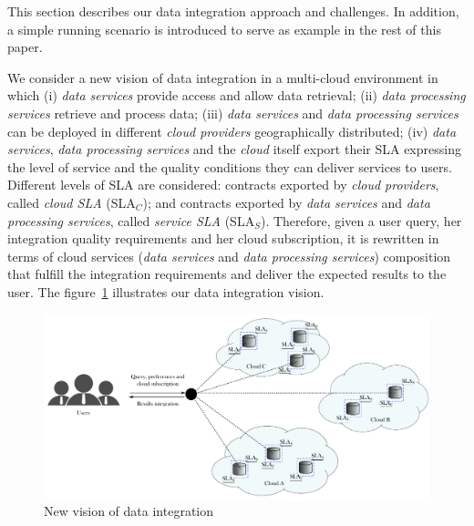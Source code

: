 This section describes our data integration approach and challenges. In addition, a simple running scenario is introduced to serve as example in the rest of this paper.

We consider a new vision of data integration in a multi-cloud environment in which 
(i) \textit{data services} provide access and allow data retrieval;  
(ii) \textit{data processing services} retrieve and process data; 
(iii) \textit{data services} and \textit{data processing services} can be deployed in different \textit{cloud providers} geographically distributed; 
(iv) \textit{data services}, \textit{data processing services} and the \textit{cloud} itself export their SLA expressing the level of service and the quality conditions they can deliver services to users. Different levels of SLA are considered: contracts exported by \textit{cloud providers}, called \textit{cloud SLA} (SLA$_{C}$); and contracts exported by \textit{data services} and \textit{data processing services}, called \textit{service SLA} (SLA$_{S}$). 
Therefore, given a user query, her integration quality requirements and her cloud subscription, it is rewritten in terms of cloud services (\textit{data services} and \textit{data processing services}) composition that fulfill the integration requirements and deliver the expected results to the user.
The figure~\ref{fig:scenario} illustrates our data integration vision.

\begin{figure}[h!]
\center
\includegraphics[scale=0.57]{scenario.pdf}
\caption{New vision of data integration}\label{fig:scenario}
\end{figure}


